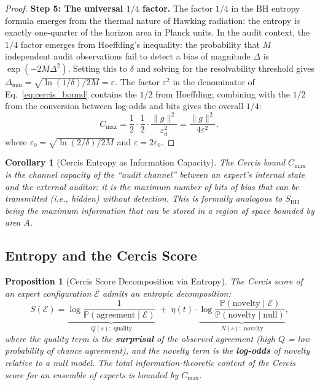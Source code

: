 \documentclass[12pt,a4paper]{article}
\newtheorem{proposition}[theorem]{Proposition}
\newtheorem{corollary}[theorem]{Corollary}
\theoremstyle{remark}
\newcommand{\Pbb}{\mathbb{P}}
\newcommand{\Cercis}{\textsf{Cercis}}
\begin{document}
\begin{proof}
\smallskip
\noindent\textbf{Step 5: The universal $1/4$ factor.}
The factor $1/4$ in the BH entropy formula emerges from the thermal nature of Hawking radiation: the entropy is exactly one-quarter of the horizon area in Planck units. In the audit context, the $1/4$ factor emerges from Hoeffding's inequality: the probability that $M$ independent audit observations fail to detect a bias of magnitude $\Delta$ is $\exp(-2M\Delta^2)$. Setting this to $\delta$ and solving for the resolvability threshold gives $\Delta_{\min} = \sqrt{\ln(1/\delta) / 2M} = \varepsilon$. The factor $\varepsilon^2$ in the denominator of Eq.~\eqref{eq:cercis_bound} contains the $1/2$ from Hoeffding; combining with the $1/2$ from the conversion between log-odds and bits gives the overall $1/4$:
\begin{equation}
  C_{\max} = \frac{1}{2} \cdot \frac{1}{2} \cdot \frac{\|g\|^2}{\varepsilon_0^2} = \frac{\|g\|^2}{4\varepsilon^2},
\end{equation}
where $\varepsilon_0 = \sqrt{\ln(2/\delta) / 2M}$ and $\varepsilon = 2\varepsilon_0$.
\end{proof}

\begin{corollary}[Cercis Entropy as Information Capacity]
\label{cor:cercis_capacity}
The \Cercis{} bound $C_{\max}$ is the channel capacity of the ``audit channel'' between an expert's internal state and the external auditor: it is the maximum number of bits of bias that can be transmitted (i.e., hidden) without detection. This is formally analogous to $S_{\text{BH}}$ being the maximum information that can be stored in a region of space bounded by area $A$.
\end{corollary}

\subsection{Entropy and the Cercis Score}

\begin{proposition}[Cercis Score Decomposition via Entropy]
\label{prop:cercis_entropy}
The \Cercis{} score of an expert configuration $\mathcal{E}$ admits an entropic decomposition:
\begin{equation}
  S(\mathcal{E}) = \underbrace{\log \frac{1}{\Pbb(\text{agreement} \mid \mathcal{E})}}_{Q(s): \text{ quality}} \;+\;
  \eta(t) \cdot \underbrace{\log \frac{\Pbb(\text{novelty} \mid \mathcal{E})}{\Pbb(\text{novelty} \mid \text{null})}}_{N(s): \text{ novelty}},
\end{equation}
where the quality term is the \textbf{surprisal} of the observed agreement (high $Q$ = low probability of chance agreement), and the novelty term is the \textbf{log-odds} of novelty relative to a null model. The total information-theoretic content of the \Cercis{} score for an ensemble of experts is bounded by $C_{\max}$.
\end{proposition}
\end{document}
